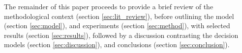 
The remainder of this paper proceeds to provide a brief review of the methodological context (section \ref{sec:lit_review}), before outlining the model (section \ref{sec:model}), and experiments (section \ref{sec:method}), with selected results (section \ref{sec:results}), followed by a discussion contrasting the decision models (section \ref{sec:discussion}), and conclusions (section \ref{sec:conclusion}).